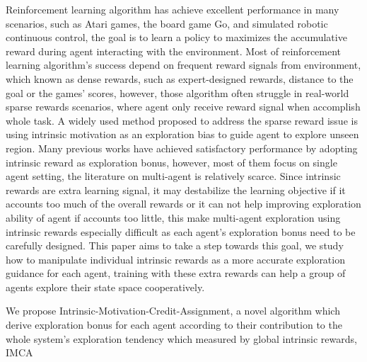 \documentclass{article} %
\begin{document}
Reinforcement learning algorithm has achieve excellent performance in many scenarios, such as Atari games\cite{Human-level}, the board game Go\cite{Go}, and simulated robotic continuous control\cite{continuous}, the goal is to learn a policy to maximizes the accumulative reward during agent interacting with the environment. Most of reinforcement learning algorithm's success depend on frequent reward signals from environment, which known as dense rewards, such as expert-designed rewards\cite{expert}, distance to the goal\cite{distance} or the games' scores\cite{Human-level}, however, those algorithm often struggle in real-world sparse rewards scenarios, where agent only receive reward signal when accomplish whole task. A widely used method proposed to address the sparse reward issue is using intrinsic motivation as an exploration bias to guide agent to explore unseen region. Many previous works have achieved satisfactory performance by adopting intrinsic reward as exploration bonus, however, most of them focus on single agent setting\cite{Count,ICM,SF,RND,RIDE,NGU}, the literature on multi-agent is relatively scarce\cite{Influence,Social,Synergistic,Cooperative}. Since intrinsic rewards are extra learning signal, it may destabilize the learning objective if it accounts too much of the overall rewards or it can not help improving exploration ability of agent if accounts too little, this make multi-agent exploration using intrinsic rewards especially difficult as each agent's exploration bonus need to be carefully designed. This paper aims to take a step towards this goal, we study how to manipulate individual intrinsic rewards as a more accurate exploration guidance for each agent, training with these extra rewards can help a group of agents explore their state space cooperatively.

We propose Intrinsic-Motivation-Credit-Assignment, a novel algorithm which derive exploration bonus for each agent according to their contribution to the whole system’s exploration tendency which measured by global intrinsic rewards, IMCA
\end{document}
